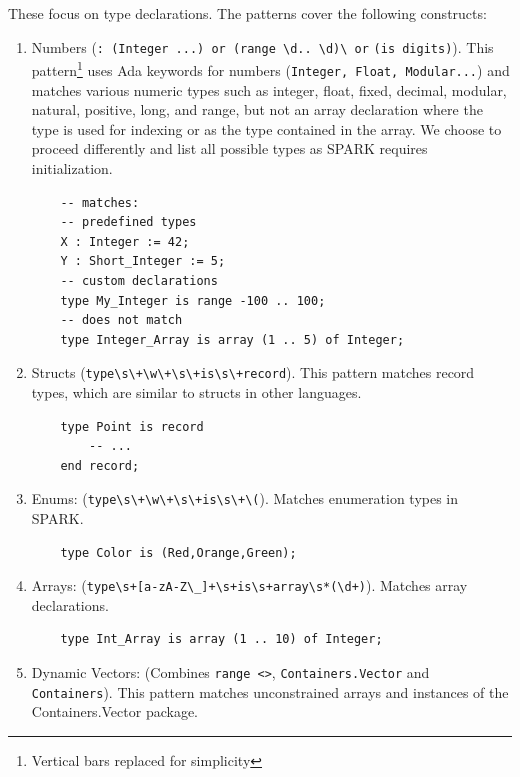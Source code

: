\documentclass[nomenclature, english, bibtex]{kththesis}
\begin{document}
These focus on type declarations.
The patterns cover the following constructs:

\begin{enumerate}
    \item Numbers 
(\verb|: (Integer ...) or (range \d.. \d)\ or| \verb|(is digits)|).
This pattern\footnote{Vertical bars replaced for simplicity} uses Ada keywords for numbers (\texttt{Integer, Float, Modular...}) and matches various numeric types such as integer, float, fixed, decimal, modular, natural, positive, long, and range, but not an array declaration where the type is used for indexing or as the type contained in the array. We choose to proceed differently and list all possible types as SPARK requires initialization.

    \begin{verbatim}
    -- matches:
    -- predefined types
    X : Integer := 42;
    Y : Short_Integer := 5;
    -- custom declarations
    type My_Integer is range -100 .. 100;
    -- does not match
    type Integer_Array is array (1 .. 5) of Integer;
    \end{verbatim}

    \item Structs (\verb|type\s\+\w\+\s\+is\s\+record|). This pattern matches record types, which are similar to structs in other languages.

    \begin{verbatim}
    type Point is record
        -- ...
    end record;
    \end{verbatim}

    \item Enums: (\verb|type\s\+\w\+\s\+is\s\+\(|). Matches enumeration types in SPARK.

    \begin{verbatim}
    type Color is (Red,Orange,Green);
    \end{verbatim}

    \item Arrays: (\verb|type\s+[a-zA-Z\_]+\s+is\s+array\s*(\d+)|). Matches array declarations.

    \begin{verbatim}
    type Int_Array is array (1 .. 10) of Integer;
    \end{verbatim}

    \item Dynamic Vectors: (Combines \verb|range <>|, \verb|Containers.Vector| and \verb|Containers|).
This pattern matches unconstrained arrays and instances of the Containers.Vector package.


\end{enumerate}
\end{document}
